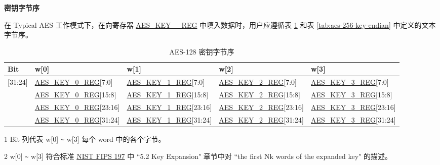 \documentclass[main\_\_CN.tex]{subfiles}
\begin{document}
\textbf{密钥字节序}

在 Typical AES 工作模式下，在向寄存器 \hyperref[regdesc:AESKEYnREG]{AES\_KEY\_\_REG} 中填入数据时，用户应遵循表 \ref{tab:aes-128-key-endian} 和表 \ref{tab:aes-256-key-endian} 中定义的文本字节序。              
\begin{table}[H]
    \centering
    \caption{AES-128 密钥字节序}
    \label{tab:aes-128-key-endian}

    \begin{threeparttable}
    \begin{tabular}{ |l|l|l|l|l| }
    \hline
        \rowcolor{lightgray}
        \textbf{Bit}\tnote{1} &  \textbf{w[0]}    &   \textbf{w[1]}    &   \textbf{w[2]}    &   \textbf{w[3]}\tnote{2}     \\\hline
        
        [31:24]     &   \hyperref[regdesc:AESKEYnREG]{AES\_KEY\_0\_REG}[7:0]    &   \hyperref[regdesc:AESKEYnREG]{AES\_KEY\_1\_REG}[7:0]    &   \hyperref[regdesc:AESKEYnREG]{AES\_KEY\_2\_REG}[7:0]    &   \hyperref[regdesc:AESKEYnREG]{AES\_KEY\_3\_REG}[7:0]\\ \hline
        [23:16]     &   \hyperref[regdesc:AESKEYnREG]{AES\_KEY\_0\_REG}[15:8]   &   \hyperref[regdesc:AESKEYnREG]{AES\_KEY\_1\_REG}[15:8]   &   \hyperref[regdesc:AESKEYnREG]{AES\_KEY\_2\_REG}[15:8]   &   \hyperref[regdesc:AESKEYnREG]{AES\_KEY\_3\_REG}[15:8]\\ \hline
        [15:8]  &   \hyperref[regdesc:AESKEYnREG]{AES\_KEY\_0\_REG}[23:16]  &   \hyperref[regdesc:AESKEYnREG]{AES\_KEY\_1\_REG}[23:16]  &   \hyperref[regdesc:AESKEYnREG]{AES\_KEY\_2\_REG}[23:16]  &   \hyperref[regdesc:AESKEYnREG]{AES\_KEY\_3\_REG}[23:16]\\ \hline
        [7:0]   &   \hyperref[regdesc:AESKEYnREG]{AES\_KEY\_0\_REG}[31:24]  &   \hyperref[regdesc:AESKEYnREG]{AES\_KEY\_1\_REG}[31:24]  & \hyperref[regdesc:AESKEYnREG]{AES\_KEY\_2\_REG}[31:24]    &   \hyperref[regdesc:AESKEYnREG]{AES\_KEY\_3\_REG}[31:24]\\ \hline
        \end{tabular}

        \begin{tablenotes}
            \item[1] Bit 列代表 w[0] \verb+~+ w[3] 每个 word 中的各个字节。
            \item[2] w[0] \verb+~+ w[3] 符合标准 \href{https://nvlpubs.nist.gov/nistpubs/FIPS/NIST.FIPS.197.pdf}{NIST FIPS 197} 中 ``5.2 Key Expansion" 章节中对 ``the first Nk words of the expanded key" 的描述。
        \end{tablenotes}
     \end{threeparttable}
\end{table}
\end{document}
